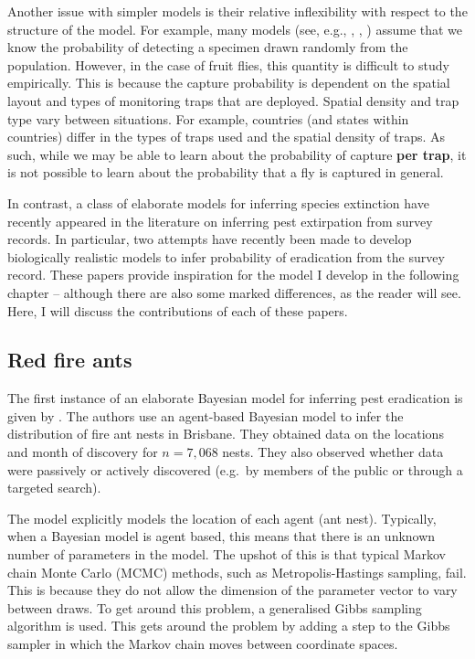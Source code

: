 \documentclass[
  oneside]{book}
\begin{document}
Another issue with simpler models is their relative inflexibility with respect to the structure of the model. For example, many models (see, e.g., \citet{mcardle}, \citet{barnes}, \citet{boakes}) assume that we know the probability of detecting a specimen drawn randomly from the population. However, in the case of fruit flies, this quantity is difficult to study empirically. This is because the capture probability is dependent on the spatial layout and types of monitoring traps that are deployed. Spatial density and trap type vary between situations. For example, countries (and states within countries) differ in the types of traps used and the spatial density of traps. As such, while we may be able to learn about the probability of capture \textbf{per trap}, it is not possible to learn about the probability that a fly is captured in general.

In contrast, a class of elaborate models for inferring species extinction have recently appeared in the literature on inferring pest extirpation from survey records. In particular, two attempts have recently been made to develop biologically realistic models to infer probability of eradication from the survey record. These papers provide inspiration for the model I develop in the following chapter -- although there are also some marked differences, as the reader will see. Here, I will discuss the contributions of each of these papers.

\hypertarget{red-fire-ants}{%
\subsection{Red fire ants}\label{red-fire-ants}}

The first instance of an elaborate Bayesian model for inferring pest eradication is given by \citet{keith2013}. The authors use an agent-based Bayesian model to infer the distribution of fire ant nests in Brisbane. They obtained data on the locations and month of discovery for \(n = 7{,}068\) nests. They also observed whether data were passively or actively discovered (e.g.~by members of the public or through a targeted search).

The model explicitly models the location of each agent (ant nest). Typically, when a Bayesian model is agent based, this means that there is an unknown number of parameters in the model. The upshot of this is that typical Markov chain Monte Carlo (MCMC) methods, such as Metropolis-Hastings sampling, fail. This is because they do not allow the dimension of the parameter vector to vary between draws. To get around this problem, a generalised Gibbs sampling algorithm is used. This gets around the problem by adding a step to the Gibbs sampler in which the Markov chain moves between coordinate spaces.
\end{document}
